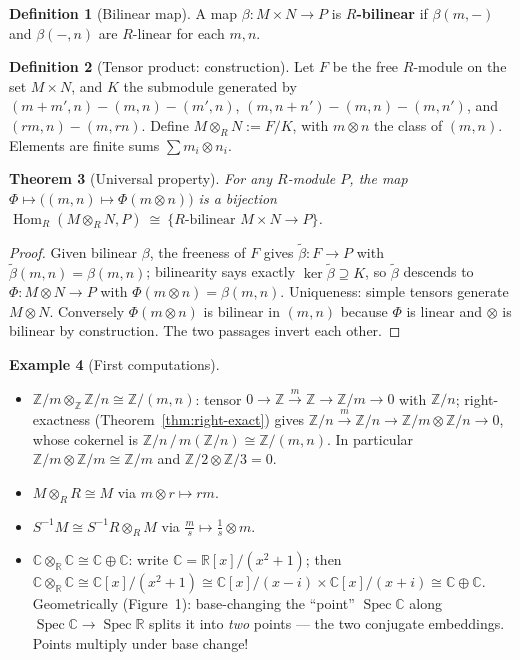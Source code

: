 \documentclass[11pt,a4paper]{article}
\newtheorem{theorem}{Theorem}[section]
\theoremstyle{definition}
\newtheorem{definition}[theorem]{Definition}
\newtheorem{example}[theorem]{Example}
\newcommand{\Z}{\mathbb{Z}}
\newcommand{\R}{\mathbb{R}}
\newcommand{\C}{\mathbb{C}}
\newcommand{\Hom}{\operatorname{Hom}}
\newcommand{\Spec}{\operatorname{Spec}}
\begin{document}
\begin{definition}[Bilinear map]
A map $\beta:M\times N\to P$ is \textbf{$R$-bilinear} if $\beta(m,-)$ and $\beta(-,n)$ are $R$-linear
for each $m,n$.
\end{definition}

\begin{definition}[Tensor product: construction]
Let $F$ be the free $R$-module on the set $M\times N$, and $K$ the submodule generated by
$(m+m',n)-(m,n)-(m',n)$, $(m,n+n')-(m,n)-(m,n')$, and $(rm,n)-(m,rn)$. Define
$M\otimes_R N:=F/K$, with $m\otimes n$ the class of $(m,n)$. Elements are finite sums $\sum m_i\otimes n_i$.
\end{definition}

\begin{theorem}[Universal property]\label{thm:tensor-up}
For any $R$-module $P$, the map $\Phi\mapsto \big((m,n)\mapsto\Phi(m\otimes n)\big)$ is a bijection
$\Hom_R(M\otimes_R N,P)\ \cong\ \{\text{$R$-bilinear } M\times N\to P\}$.
\end{theorem}
\begin{proof}
Given bilinear $\beta$, the freeness of $F$ gives $\tilde\beta:F\to P$ with $\tilde\beta(m,n)=\beta(m,n)$;
bilinearity says exactly $\ker\tilde\beta\supseteq K$, so $\tilde\beta$ descends to $\Phi:M\otimes N\to P$
with $\Phi(m\otimes n)=\beta(m,n)$. Uniqueness: simple tensors generate $M\otimes N$. Conversely
$\Phi(m\otimes n)$ is bilinear in $(m,n)$ because $\Phi$ is linear and $\otimes$ is bilinear by
construction. The two passages invert each other.
\end{proof}

\begin{example}[First computations]\label{ex:tensor-comp}
\begin{itemize}
  \item $\Z/m\otimes_\Z\Z/n\cong\Z/(m,n)$: tensor $0\to\Z\xrightarrow{m}\Z\to\Z/m\to0$ with $\Z/n$;
    right-exactness (Theorem~\ref{thm:right-exact}) gives $\Z/n\xrightarrow{m}\Z/n\to\Z/m\otimes\Z/n\to0$,
    whose cokernel is $\Z/n\,/\,m(\Z/n)\cong\Z/(m,n)$. In particular $\Z/m\otimes\Z/m\cong\Z/m$ and
    $\Z/2\otimes\Z/3=0$.
  \item $M\otimes_R R\cong M$ via $m\otimes r\mapsto rm$.
  \item $S^{-1}M\cong S^{-1}R\otimes_R M$ via $\frac{m}{s}\mapsto\frac1s\otimes m$.
  \item $\C\otimes_\R\C\cong\C\oplus\C$: write $\C=\R[x]/(x^2+1)$; then
    $\C\otimes_\R\C\cong\C[x]/(x^2+1)\cong\C[x]/(x-i)\times\C[x]/(x+i)\cong\C\oplus\C$.
    Geometrically (Figure~1): base-changing the ``point'' $\Spec\C$ along $\Spec\C\to\Spec\R$ splits it
    into \emph{two} points --- the two conjugate embeddings. Points multiply under base change!
\end{itemize}
\end{example}
\end{document}
